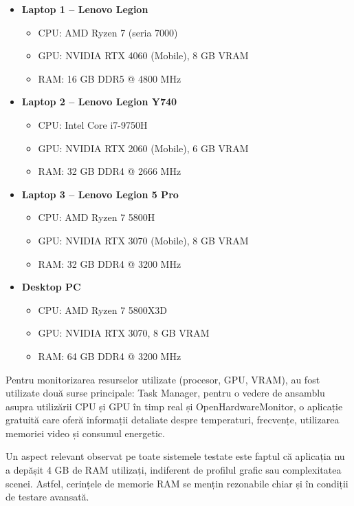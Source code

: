 \begin{itemize}
  \item \textbf{Laptop 1 – Lenovo Legion}
  \begin{itemize}
    \item CPU: AMD Ryzen 7 (seria 7000)
    \item GPU: NVIDIA RTX 4060 (Mobile), 8 GB VRAM
    \item RAM: 16 GB DDR5 @ 4800 MHz
  \end{itemize}
  
  \item \textbf{Laptop 2 – Lenovo Legion Y740}
  \begin{itemize}
    \item CPU: Intel Core i7-9750H
    \item GPU: NVIDIA RTX 2060 (Mobile), 6 GB VRAM
    \item RAM: 32 GB DDR4 @ 2666 MHz
  \end{itemize}
  
  \item \textbf{Laptop 3 – Lenovo Legion 5 Pro}
  \begin{itemize}
    \item CPU: AMD Ryzen 7 5800H
    \item GPU: NVIDIA RTX 3070 (Mobile), 8 GB VRAM
    \item RAM: 32 GB DDR4 @ 3200 MHz
  \end{itemize}
  
  \item \textbf{Desktop PC}
  \begin{itemize}
    \item CPU: AMD Ryzen 7 5800X3D
    \item GPU: NVIDIA RTX 3070, 8 GB VRAM
    \item RAM: 64 GB DDR4 @ 3200 MHz
  \end{itemize}
\end{itemize}

Pentru monitorizarea resurselor utilizate (procesor, GPU, VRAM), au fost utilizate două surse principale: Task Manager, pentru o vedere de ansamblu asupra utilizării CPU și GPU în timp real și OpenHardwareMonitor, o aplicație gratuită care oferă informații detaliate despre temperaturi, frecvențe, utilizarea memoriei video și consumul energetic.

Un aspect relevant observat pe toate sistemele testate este faptul că aplicația nu a depășit 4 GB de RAM utilizați, indiferent de profilul grafic sau complexitatea scenei. Astfel, cerințele de memorie RAM se mențin rezonabile chiar și în condiții de testare avansată.


